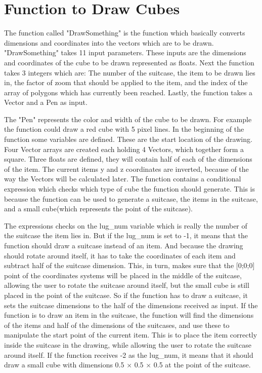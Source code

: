 \section{Function to Draw Cubes}
\label{sec:cube}
The function called "DrawSomething" is the function which basically converts dimensions and coordinates into the vectors which are to be drawn.
"DrawSomething" takes 11 input parameters. These inputs are the dimensions and coordinates of the cube to be drawn represented as floats. Next the function takes 3 integers which are: The number of the suitcase, the item to be drawn lies in, the factor of zoom that should be applied to the item, and the index of the array of polygons which has currently been reached. Lastly, the function takes a Vector and a Pen as input.

The "Pen" represents the color and width of the cube to be drawn. For example the function could draw a red cube with 5 pixel lines. In the beginning of the function some variables are defined. These are the start location of the drawing. Four Vector arrays are created each holding 4 Vectors, which together form a square.
Three floats are defined, they will contain half of each of the dimensions of the item.
The current items y and z coordinates are inverted, because of the way the Vectors will be calculated later. 
The function contains a conditional expression which checks which type of cube the function should generate. This is because the function can be used to generate a suitcase, the items in the suitcase, and a small cube(which represents the  point of the suitcase). 

The expressions checks on the lug\_num variable which is really the number of the suitcase the item lies in. But if the lug\_num is set to -1, it means that the function should draw a suitcase instead of an item. And because the drawing should rotate around itself, it has to take the coordinates of each item and subtract half of the suitcase dimension. This, in turn, makes sure that the [0;0;0] point of the coordinates systems will be placed in the middle of the suitcase, allowing the user to rotate the suitcase around itself, but the small cube is still placed in the  point of the suitcase.
So if the function has to draw a suitcase, it sets the suitcase dimensions to the half of the dimensions received as input.
If the function is to draw an item in the suitcase, the function will find the dimensions of the items and half of the dimensions of the suitcases, and use these to manipulate the start point of the current item. This is to place the item correctly inside the suitcase in the drawing, while allowing the user to rotate the suitcase around itself. 
If the function receives -2 as the lug\_num, it means that it should draw a small cube with dimensions 0.5 × 0.5 × 0.5 at the  point of the suitcase.

